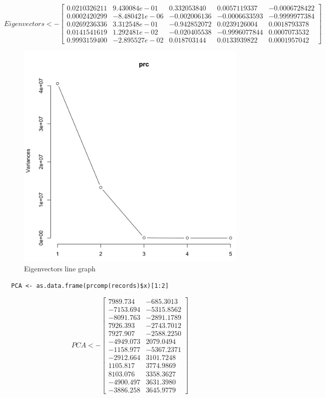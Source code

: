 \documentclass{report}
\begin{document}
\[
  Eigenvectors <- 
  \begin{bmatrix}
    0.0210326211 & 9.430084e-01 & 0.332053840 & 0.0057119337 & -0.0006728422 \\
    0.0002420299 & -8.480421e-06 & -0.002006136 & -0.0006633593 & -0.9999977384 \\
    0.0269236336 & 3.312548e-01 & -0.942852072 & 0.0239126004 & 0.0018793378 \\
    0.0141541619 & 1.292481e-02 & -0.020405538 & -0.9996077844 & 0.0007073532 \\
    0.9993159400 & -2.895527e-02 & 0.018703144 & 0.0133939822 & 0.0001957042
  \end{bmatrix}
\]

\begin{figure}[h!]
	\includegraphics[width=\linewidth]{eigenvectors graph.png}
	 \caption{Eigenvectors line graph}
	\label{fig:eigenvectorslinegraph}
\end{figure}

\begin{verbatim}	
  PCA <- as.data.frame(prcomp(records)$x)[1:2]
\end{verbatim}

\[
  PCA <- 
  \begin{bmatrix}
    7989.734 & -685.3013 \\
    -7153.694 & -5315.8562 \\
    -8091.763 & -2891.1789 \\
    7926.393 & -2743.7012 \\
    7927.907 & -2588.2250 \\
    -4949.073 & 2079.0494 \\
    -1158.977 & -5367.2371 \\
    -2912.664 & 3101.7248 \\
    1105.817 & 3774.9869 \\
    8103.076 & 3358.3627 \\
    -4900.497 & 3631.3980 \\
    -3886.258 & 3645.9779
  \end{bmatrix}
\]
\end{document}

